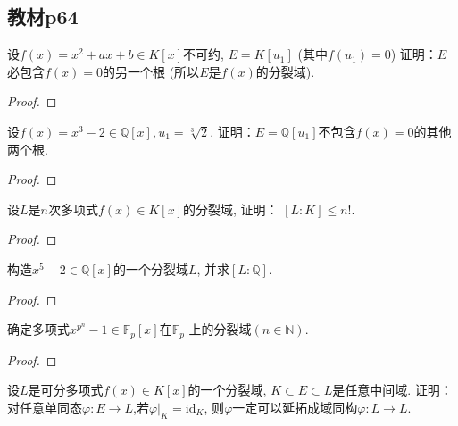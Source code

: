 \subsection{教材p64}

\begin{problem}
    设$f(x) = x^2 + ax + b \in K[x]$不可约, $E = K[u_1]$
(其中$f(u_1) = 0$) 证明：$E$必包含$f(x) = 0$的另一个根
(所以$E$是$f(x)$的分裂域).
\end{problem}

\begin{proof}
    
\end{proof}

\begin{problem}
    设$f(x) = x^3 - 2 \in \mathbb{Q}[x], u_1 = \sqrt[3]{2}$.
证明：$E = \mathbb{Q}[u_1]$不包含$f(x) = 0$的其他两个根.
\end{problem}

\begin{proof}
    
\end{proof}

\begin{problem}
    设$L$是$n$次多项式$f(x) \in K[x]$的分裂域, 证明：
$[L:K] \leqslant n!$.
\end{problem}

\begin{proof}
    
\end{proof}

\begin{problem}
    构造$x^5 - 2 \in \mathbb{Q}[x]$的一个分裂域$L$,
并求$[L:\mathbb{Q}]$.
\end{problem}

\begin{proof}
    
\end{proof}

\begin{problem}
    确定多项式$x^{p^n} - 1 \in \mathbb{F}_p[x]$在$\mathbb{F}_p$
上的分裂域$(n \in \mathbb{N})$.
\end{problem}

\begin{proof}
    
\end{proof}

\begin{problem}
    设$L$是可分多项式$f(x) \in K[x]$的一个分裂域, $K \subset E \subset L$是任意中间域.
证明：对任意单同态$\varphi:E \to L$,若$\varphi|_K = \mathrm{id}_K$,
则$\varphi$一定可以延拓成域同构$\overline\varphi:L \to L$.
\end{problem}

